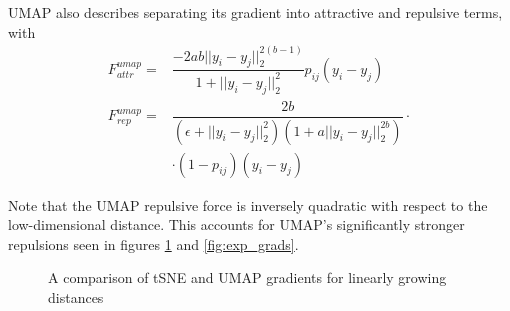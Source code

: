 \documentclass{article}
\theoremstyle{definition}
\begin{document}
UMAP also describes separating its gradient into attractive and repulsive terms, with
\begin{align}
    F_{attr}^{umap} = &\dfrac{-2ab||y_i - y_j||_2^{2(b-1)}}{1 + ||y_i - y_j||_2^2} p_{ij} (y_i - y_j) \\
    F_{rep}^{umap} = &\dfrac{2b}{(\epsilon + ||y_i - y_j||_2^2)(1 + a ||y_i - y_j||_2^{2b})} \cdot \\
    &\cdot (1 - p_{ij}) (y_i - y_j) \label{umap_rep}
\end{align}

Note that the UMAP repulsive force is inversely quadratic with respect to the low-dimensional distance. This accounts for UMAP's significantly stronger
repulsions seen in figures \ref{fig:linear_grads} and \ref{fig:exp_grads}.

\begin{figure}
\centering
	\qquad
	\caption{A comparison of tSNE and UMAP gradients for linearly growing distances}%
	\label{fig:linear_grads}%
\end{figure}
\end{document}
